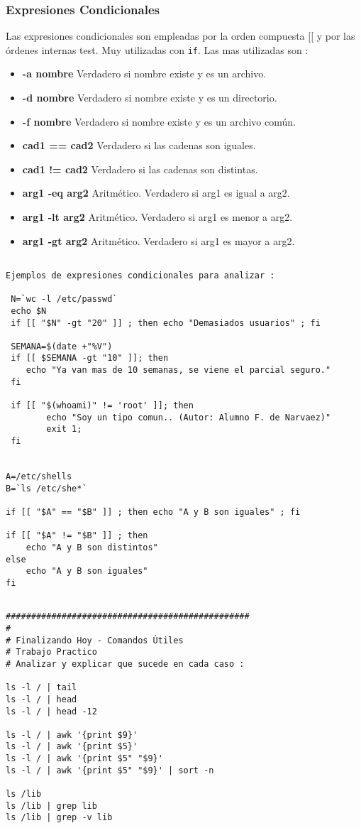 \documentclass{beamer}
\begin{document}
\begin{frame}
\frametitle{Expresiones Condicionales}
Las expresiones condicionales son empleadas por la orden compuesta [[ y por las órdenes internas test. Muy utilizadas con \texttt{if}. Las mas utilizadas son :

\begin{itemize}
\item \textbf{-a nombre} Verdadero si nombre existe y es un archivo.
\item \textbf{-d nombre} Verdadero si nombre existe y es un directorio.
\item \textbf{-f nombre} Verdadero si nombre existe y es un archivo común.
\item \textbf{cad1 == cad2 } Verdadero si las cadenas son iguales.
\item \textbf{cad1 != cad2 } Verdadero si las cadenas son distintas.
\item \textbf{arg1 -eq arg2} Aritmético. Verdadero si arg1 es igual a arg2.
\item \textbf{arg1 -lt arg2} Aritmético. Verdadero si arg1 es menor a arg2.
\item \textbf{arg1 -gt arg2} Aritmético. Verdadero si arg1 es mayor a arg2.

\end{itemize}
\end{frame}

\begin{Verbatim}

Ejemplos de expresiones condicionales para analizar :

 N=`wc -l /etc/passwd`
 echo $N
 if [[ "$N" -gt "20" ]] ; then echo "Demasiados usuarios" ; fi

 SEMANA=$(date +"%V")
 if [[ $SEMANA -gt "10" ]]; then
	echo "Ya van mas de 10 semanas, se viene el parcial seguro."
 fi

 if [[ "$(whoami)" != 'root' ]]; then
        echo "Soy un tipo comun.. (Autor: Alumno F. de Narvaez)"
        exit 1;
 fi


A=/etc/shells
B=`ls /etc/she*`

if [[ "$A" == "$B" ]] ; then echo "A y B son iguales" ; fi

if [[ "$A" != "$B" ]] ; then
	echo "A y B son distintos"
else
	echo "A y B son iguales"
fi

\end{Verbatim}




\begin{Verbatim}

################################################
#
# Finalizando Hoy - Comandos Útiles
# Trabajo Practico 
# Analizar y explicar que sucede en cada caso :

ls -l / | tail 
ls -l / | head 
ls -l / | head -12

ls -l / | awk '{print $9}'
ls -l / | awk '{print $5}'
ls -l / | awk '{print $5" "$9}'
ls -l / | awk '{print $5" "$9}' | sort -n

ls /lib
ls /lib | grep lib
ls /lib | grep -v lib
\end{Verbatim}
\end{document}
